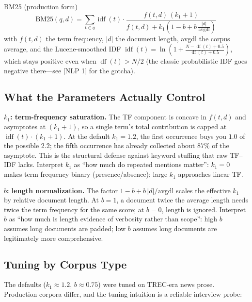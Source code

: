 \begin{mathresult}{BM25 (production form)}
\begin{equation}
\text{BM25}(q, d) = \sum_{t \in q} \operatorname{idf}(t) \cdot \frac{f(t,d)\,(k_1 + 1)}{f(t,d) + k_1\left(1 - b + b\,\frac{|d|}{\text{avgdl}}\right)}
\label{sr:eq:bm25}
\end{equation}
with $f(t,d)$ the term frequency, $|d|$ the document length, avgdl the corpus average, and the Lucene-smoothed IDF
$\operatorname{idf}(t) = \ln\!\left(1 + \frac{N - \operatorname{df}(t) + 0.5}{\operatorname{df}(t) + 0.5}\right)$,
which stays positive even when $\operatorname{df}(t) > N/2$ (the classic probabilistic IDF goes negative there---see [NLP 1] for the gotcha).
\end{mathresult}

\subsection{What the Parameters Actually Control}

\textbf{$k_1$: term-frequency saturation.} The TF component is concave in $f(t,d)$ and asymptotes at $(k_1+1)$, so a single term's total contribution is capped at $\operatorname{idf}(t)\cdot(k_1+1)$. At the default $k_1 = 1.2$, the first occurrence buys you $1.0$ of the possible $2.2$; the fifth occurrence has already collected about $87\%$ of the asymptote. This is the structural defense against keyword stuffing that raw TF--IDF lacks. Interpret $k_1$ as ``how much do repeated mentions matter'': $k_1 = 0$ makes term frequency binary (presence/absence); large $k_1$ approaches linear TF.

\textbf{$b$: length normalization.} The factor $1 - b + b\,|d|/\text{avgdl}$ scales the effective $k_1$ by relative document length. At $b = 1$, a document twice the average length needs twice the term frequency for the same score; at $b = 0$, length is ignored. Interpret $b$ as ``how much is length evidence of verbosity rather than scope'': high $b$ assumes long documents are padded; low $b$ assumes long documents are legitimately more comprehensive.

\subsection{Tuning by Corpus Type}

The defaults ($k_1 \approx 1.2$, $b \approx 0.75$) were tuned on TREC-era news prose. Production corpora differ, and the tuning intuition is a reliable interview probe:

